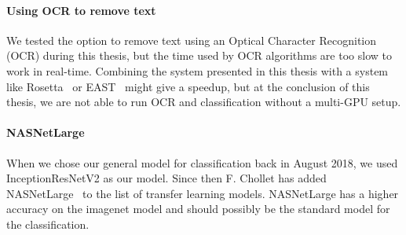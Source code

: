 \paragraph{Using OCR to remove text}
We tested the option to remove text using an Optical Character Recognition (OCR) during this thesis, but the time used by OCR algorithms are too slow to work in real-time. Combining the system presented in this thesis with a system like Rosetta~\cite{borisyuk2018rosetta} or EAST~\cite{DBLP:journals/corr/ZhouYWWZHL17} might give a speedup, but at the conclusion of this thesis, we are not able to run OCR and classification without a multi-GPU setup.


\paragraph{NASNetLarge}
When we chose our general model for classification back in August 2018, we used InceptionResNetV2 as our model. Since then F. Chollet has added NASNetLarge~\cite{DBLP:journals/corr/ZophVSL17} to the list of transfer learning models. NASNetLarge has a higher accuracy on the imagenet model and should possibly be the standard model for the classification.



